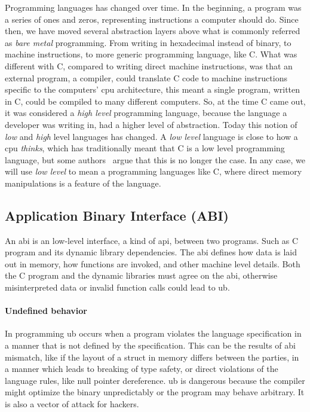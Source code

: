 Programming languages has changed over time. In the beginning, a program was a
series of ones and zeros, representing instructions a computer should do. Since
then, we have moved several abstraction layers above what is commonly referred
as \textit{bare metal} programming. From writing in hexadecimal instead of
binary, to machine instructions, to more generic programming language, like C.
What was different with C, compared to writing direct machine instructions, was
that an external program, a compiler, could translate C code to machine
instructions specific to the computers' \gls*{cpu} architecture, this meant a
single program, written in C, could be compiled to many different computers. So,
at the time C came out, it was considered a \textit{high level} programming
language, because the language a developer was writing in, had a higher level of
abstraction. Today this notion of \textit{low} and \textit{high} level languages
has changed. A \textit{low level} language is close to how a \gls*{cpu}
\textit{thinks}, which has traditionally meant that C is a low level programming
language, but some authors~\cite{cNotLowLevel} argue that this is no longer the
case. In any case, we will use \textit{low level} to mean a programming
languages like C, where direct memory manipulations is a feature of the
language.

\subsection{Application Binary Interface (ABI)}

An \gls*{abi} is an low-level interface, a kind of \gls*{api},
between two programs. Such as C program and its dynamic library dependencies.
The \gls*{abi} defines how data is laid out in memory, how functions are
invoked, and other machine level details. Both the C program and the dynamic
libraries must agree on the \gls*{abi}, otherwise misinterpreted data or invalid
function calls could lead to \gls*{ub}.

\paragraph{Undefined behavior} In programming \gls*{ub} occurs when a program
violates the language specification in a manner that is not defined by the
specification. This can be the results of \gls*{abi} mismatch, like if the
layout of a struct in memory differs between the parties, in a manner which
leads to breaking of type safety, or direct violations of the language rules,
like null pointer dereference. \gls*{ub} is dangerous because the compiler might
optimize the binary unpredictably or the program may behave arbitrary. It is
also a vector of attack for hackers.



